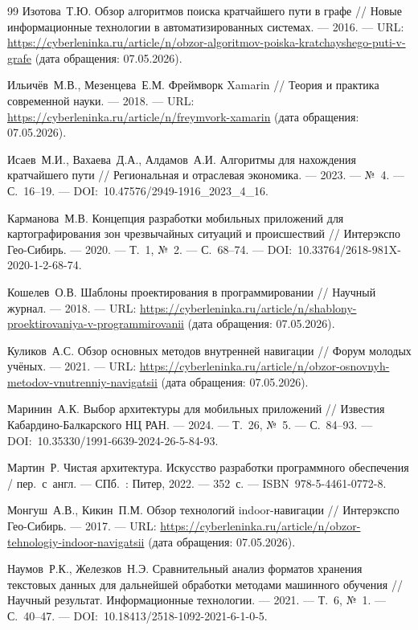 \begin{thebibliography}{99}
	 Изотова~Т.Ю. Обзор алгоритмов поиска кратчайшего пути в графе // Новые информационные технологии в автоматизированных системах. --- 2016. --- URL: \url{https://cyberleninka.ru/article/n/obzor-algoritmov-poiska-kratchayshego-puti-v-grafe} (дата обращения: 07.05.2026).
	
	 Ильичёв~М.В., Мезенцева~Е.М. Фреймворк Xamarin // Теория и практика современной науки. --- 2018. --- URL: \url{https://cyberleninka.ru/article/n/freymvork-xamarin} (дата обращения: 07.05.2026).
	
	 Исаев~М.И., Вахаева~Д.А., Алдамов~А.И. Алгоритмы для нахождения кратчайшего пути // Региональная и отраслевая экономика. --- 2023. --- №~4. --- С.~16--19. --- DOI:~10.47576/2949-1916\_2023\_4\_16.
	
	 Карманова~М.В. Концепция разработки мобильных приложений для картографирования зон чрезвычайных ситуаций и происшествий // Интерэкспо Гео-Сибирь. --- 2020. --- Т.~1, №~2. --- С.~68--74. --- DOI:~10.33764/2618-981X-2020-1-2-68-74.
	
	 Кошелев~О.В. Шаблоны проектирования в программировании // Научный журнал. --- 2018. --- URL: \url{https://cyberleninka.ru/article/n/shablony-proektirovaniya-v-programmirovanii} (дата обращения: 07.05.2026).
	
	 Куликов~А.С. Обзор основных методов внутренней навигации // Форум молодых учёных. --- 2021. --- URL: \url{https://cyberleninka.ru/article/n/obzor-osnovnyh-metodov-vnutrenniy-navigatsii} (дата обращения: 07.05.2026).
	
	 Маринин~А.К. Выбор архитектуры для мобильных приложений // Известия Кабардино-Балкарского НЦ РАН. --- 2024. --- Т.~26, №~5. --- С.~84--93. --- DOI:~10.35330/1991-6639-2024-26-5-84-93.
	
	 Мартин~Р. Чистая архитектура. Искусство разработки программного обеспечения / пер.~с~англ. --- СПб.~: Питер, 2022. --- 352~с. --- ISBN~978-5-4461-0772-8.
	
	 Монгуш~А.В., Кикин~П.М. Обзор технологий indoor-навигации // Интерэкспо Гео-Сибирь. --- 2017. --- URL: \url{https://cyberleninka.ru/article/n/obzor-tehnologiy-indoor-navigatsii} (дата обращения: 07.05.2026).
	
	 Наумов~Р.К., Железков~Н.Э. Сравнительный анализ форматов хранения текстовых данных для дальнейшей обработки методами машинного обучения // Научный результат. Информационные технологии. --- 2021. --- Т.~6, №~1. --- С.~40--47. --- DOI:~10.18413/2518-1092-2021-6-1-0-5.
	

\end{thebibliography}
